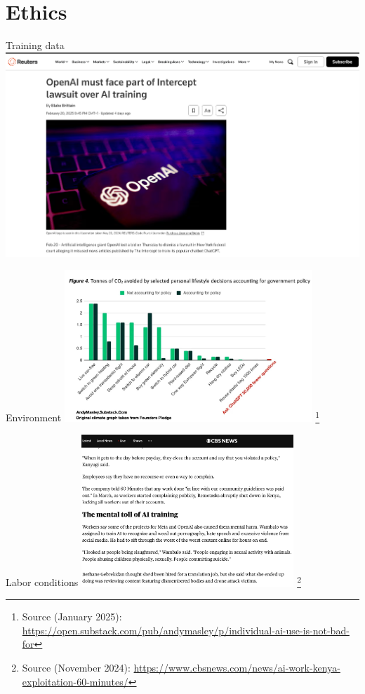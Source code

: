 \documentclass[t,xcolor={dvipsnames},final,aspectratio=169]{beamer}
\begin{document}
\section{Ethics}
\begin{frame}{Training data}
\includegraphics[width=\textwidth]{trainingdata.png}
\end{frame}

{
\begin{frame}{Environment}
\includegraphics[width=0.7\textwidth]{emissions.jpg}
\footnote{Source (January 2025): \url{https://open.substack.com/pub/andymasley/p/individual-ai-use-is-not-bad-for}}
\end{frame}
}

{
\begin{frame}{Labor conditions}
\includegraphics[width=0.6\textwidth]{labor.png}
\footnote{Source (November 2024): \url{https://www.cbsnews.com/news/ai-work-kenya-exploitation-60-minutes/}}
\end{frame}
}
\end{document}
